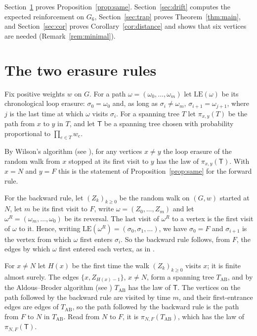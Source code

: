 \documentclass[11pt]{amsart}
\theoremstyle{remark}
\begin{document}
Section~\ref{sec:same} proves Proposition~\ref{prop:same}. Section~\ref{sec:drift} computes the expected reinforcement on $G_6$, Section~\ref{sec:trap} proves Theorem~\ref{thm:main}, and Section~\ref{sec:cor} proves Corollary~\ref{cor:distance} and shows that six vertices are needed (Remark~\ref{rem:minimal}).

\section{The two erasure rules}\label{sec:same}

Fix positive weights $w$ on $G$. For a path $\omega=(\omega_0,\dots,\omega_m)$ let $\mathrm{LE}(\omega)$ be its chronological loop erasure: $\sigma_0=\omega_0$ and, as long as $\sigma_i\ne\omega_m$, $\sigma_{i+1}=\omega_{j+1}$, where $j$ is the last time at which $\omega$ visits $\sigma_i$. For a spanning tree $T$ let $\pi_{x,y}(T)$ be the path from $x$ to $y$ in $T$, and let $\mathsf T$ be a spanning tree chosen with probability proportional to $\prod_{e\in T}w_e$.

By Wilson's algorithm \cite{Wil96} (see \cite[Corollary~4.3]{LP16}), for any vertices $x\ne y$ the loop erasure of the random walk from $x$ stopped at its first visit to $y$ has the law of $\pi_{x,y}(\mathsf T)$. With $x=N$ and $y=F$ this is the statement of Proposition~\ref{prop:same} for the forward rule.

For the backward rule, let $(Z_k)_{k\ge0}$ be the random walk on $(G,w)$ started at $N$, let $m$ be its first visit to $F$, write $\omega=(Z_0,\dots,Z_m)$ and let $\omega^R=(\omega_m,\dots,\omega_0)$ be its reversal. The last visit of $\omega^R$ to a vertex is the first visit of $\omega$ to it. Hence, writing $\mathrm{LE}(\omega^R)=(\sigma_0,\sigma_1,\dots)$, we have $\sigma_0=F$ and $\sigma_{i+1}$ is the vertex from which $\omega$ first enters $\sigma_i$. So the backward rule follows, from $F$, the edges by which $\omega$ first entered each vertex, as in \cite{MV26}.

For $x\ne N$ let $H(x)$ be the first time the walk $(Z_k)_{k\ge0}$ visits $x$; it is finite almost surely. The edges $\{x,Z_{H(x)-1}\}$, $x\ne N$, form a spanning tree $T_{\mathrm{AB}}$, and by the Aldous--Broder algorithm \cite{Ald90,Bro89} (see \cite[Corollary~4.9]{LP16}) $T_{\mathrm{AB}}$ has the law of $\mathsf T$. The vertices on the path followed by the backward rule are visited by time $m$, and their first-entrance edges are edges of $T_{\mathrm{AB}}$, so the path followed by the backward rule is the path from $F$ to $N$ in $T_{\mathrm{AB}}$. Read from $N$ to $F$, it is $\pi_{N,F}(T_{\mathrm{AB}})$, which has the law of $\pi_{N,F}(\mathsf T)$.
\end{document}
